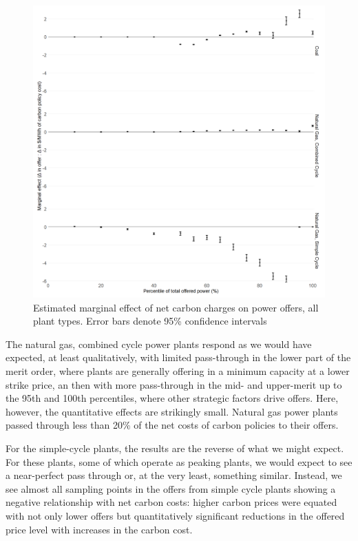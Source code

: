 \documentclass[12pt]{article}
\begin{document}
\begin{figure}[h!]
    \centering
     \includegraphics[width=.9\textwidth]{../images/by_type_net.png}
    \caption{Estimated marginal effect of net carbon charges on power offers, all plant types. Error bars denote 95\% confidence intervals}
    \label{fig:decomp_peaks}
\end{figure}

The natural gas, combined cycle power plants respond as we would have expected, at least qualitatively, with limited pass-through in the lower part of the merit order, where plants are generally offering in a minimum capacity at a lower strike price, an then with more pass-through in the mid- and upper-merit up to the 95th and 100th percentiles, where other strategic factors drive offers. Here, however, the quantitative effects are strikingly small. Natural gas power plants passed through less than 20\% of the net costs of carbon policies to their offers.

For the simple-cycle plants, the results are the reverse of what we might expect. For these plants, some of which operate as peaking plants, we would expect to see a near-perfect pass through or, at the very least, something similar. Instead, we see almost all sampling points in the offers from simple cycle plants showing a negative relationship with net carbon costs: higher carbon prices were equated with not only lower offers but quantitatively significant reductions in the offered price level with increases in the carbon cost.
\end{document}
